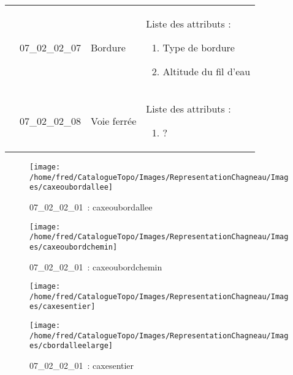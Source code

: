 \documentclass[12pt,titlepage]{book}
\begin{document}
\begin{supertabular}{|p{10cm}|c|p{13cm}|p{12cm}|}
                    & 07\_02\_02\_07 & Bordure & Liste des attributs :
\begin{enumerate}
  \item Type de bordure  \item Altitude du fil d'eau\end{enumerate}
\\


                    & 07\_02\_02\_08 & Voie ferrée & Liste des attributs :
\begin{enumerate}
  \item ?\end{enumerate}
\\
\hline
\end{supertabular}
\begin{figure}[h!]
  \hfill         %
  \begin{minipage}[t]{3cm}
    \begin{center}
      \texttt{[image: /home/fred/CatalogueTopo/Images/RepresentationChagneau/Images/caxeoubordallee]}
      \caption[~07\_02\_02\_01]{\small{07\_02\_02\_01~:} \tiny{caxeoubordallee}}\label{caxeoubordallee}
    \end{center}
  \end{minipage}
  \begin{minipage}[t]{3cm}
    \begin{center}
      \texttt{[image: /home/fred/CatalogueTopo/Images/RepresentationChagneau/Images/caxeoubordchemin]}
      \caption[~07\_02\_02\_01]{\small{07\_02\_02\_01~:} \tiny{caxeoubordchemin}}\label{caxeoubordchemin}
    \end{center}
  \end{minipage}
  \begin{minipage}[t]{3cm}
    \begin{center}
      \texttt{[image: /home/fred/CatalogueTopo/Images/RepresentationChagneau/Images/caxesentier]}
      \caption[~07\_02\_02\_01]{\small{07\_02\_02\_01~:} \tiny{caxesentier}}\label{caxesentier}
    \end{center}
  \end{minipage}
  \begin{minipage}[t]{3cm}
    \begin{center}
      \texttt{[image: /home/fred/CatalogueTopo/Images/RepresentationChagneau/Images/cbordalleelarge]}

\end{center}
\end{minipage}
\end{figure}
\end{document}
